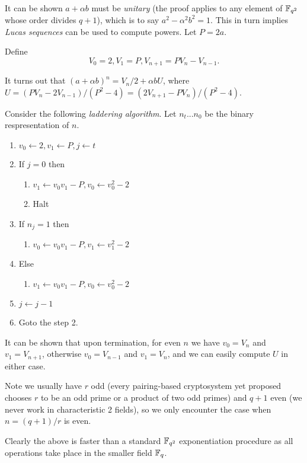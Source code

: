 It can be shown $a + \alpha b$ must be \emph {unitary} (the proof
applies to any element of $\mathbb{F}_{q^2}$ whose order divides $q+1$), which
is to say $a^2 - \alpha^2 b^2 = 1$. This in turn implies
\emph{Lucas sequences} can be used to compute powers. Let $P = 2a$.

Define
\[ V_0 = 2, V_1 = P, V_{n+1} = P V_n - V_{n-1} . \]

It turns out that $(a+\alpha b)^n = V_n / 2 + \alpha b U$,
where $U = (P V_n - 2 V_{n-1}) / (P^2 - 4)
= (2 V_{n+1} - P V_n) / (P^2 - 4)$.

Consider the following \emph {laddering algorithm}.
Let $n_t ... n_0$ be the binary respresentation of $n$.

\begin{enumerate}
\item
$v_0 \leftarrow 2, v_1 \leftarrow P, j \leftarrow t$
\item
If $j = 0$ then
\begin{enumerate}
\item
$v_1 \leftarrow v_0 v_1 - P, v_0 \leftarrow v_0^2 - 2$
\item
Halt
\end{enumerate}
\item
If $n_j = 1$ then
\begin{enumerate}
\item
$v_0 \leftarrow v_0 v_1 - P, v_1 \leftarrow v_1^2 - 2$
\end{enumerate}
\item
Else
\begin{enumerate}
\item
$v_1 \leftarrow v_0 v_1 - P, v_0 \leftarrow v_0^2 - 2$
\end{enumerate}
\item
$j \leftarrow j - 1$
\item
Goto the step 2.
\end{enumerate}

It can be shown that upon termination, for even $n$ we have
$v_0 = V_n$ and $v_1 = V_{n+1}$, otherwise
$v_0 = V_{n-1}$ and $v_1 = V_n$, and we can easily compute $U$ in either
case.

Note we usually have $r$ odd (every pairing-based cryptosystem yet
proposed chooses
$r$ to be an odd prime or a product of two odd primes) and $q + 1$
even (we never work in characteristic 2 fields), so we
only encounter the case when $n = (q + 1) / r$ is even.

Clearly the above is faster than a standard $\mathbb{F}_{q^2}$ exponentiation
procedure as all operations take place in the smaller field $\mathbb{F}_q$.

